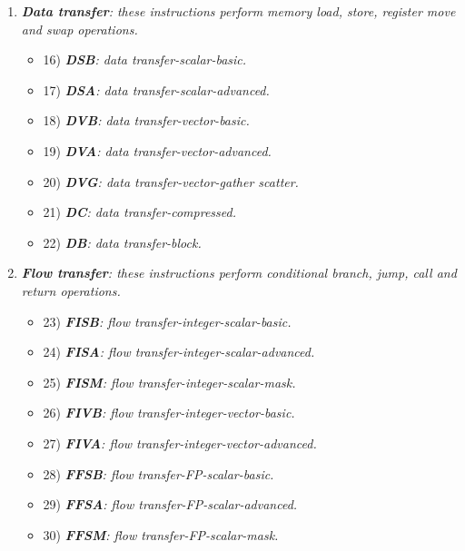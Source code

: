 \begin{enumerate}
        \item \textit{\textbf{Data transfer}: these instructions perform memory load, store, register move and swap operations.}

            \begin{itemize}

                \item 16) \textit{\textbf{DSB}: data transfer-scalar-basic.}
                \item 17) \textit{\textbf{DSA}: data transfer-scalar-advanced.}

                \item 18) \textit{\textbf{DVB}: data transfer-vector-basic.}
                \item 19) \textit{\textbf{DVA}: data transfer-vector-advanced.}
                \item 20) \textit{\textbf{DVG}: data transfer-vector-gather scatter.}

                \item 21) \textit{\textbf{DC}: data transfer-compressed.}
                \item 22) \textit{\textbf{DB}: data transfer-block.}

            \end{itemize}

        \item \textit{\textbf{Flow transfer}: these instructions perform conditional branch, jump, call and return operations.}

            \begin{itemize}

                \item 23) \textit{\textbf{FISB}: flow transfer-integer-scalar-basic.}
                \item 24) \textit{\textbf{FISA}: flow transfer-integer-scalar-advanced.}
                \item 25) \textit{\textbf{FISM}: flow transfer-integer-scalar-mask.}

                \item 26) \textit{\textbf{FIVB}: flow transfer-integer-vector-basic.}
                \item 27) \textit{\textbf{FIVA}: flow transfer-integer-vector-advanced.}

                \item 28) \textit{\textbf{FFSB}: flow transfer-FP-scalar-basic.}
                \item 29) \textit{\textbf{FFSA}: flow transfer-FP-scalar-advanced.}
                \item 30) \textit{\textbf{FFSM}: flow transfer-FP-scalar-mask.}


\end{itemize}
\end{enumerate}
